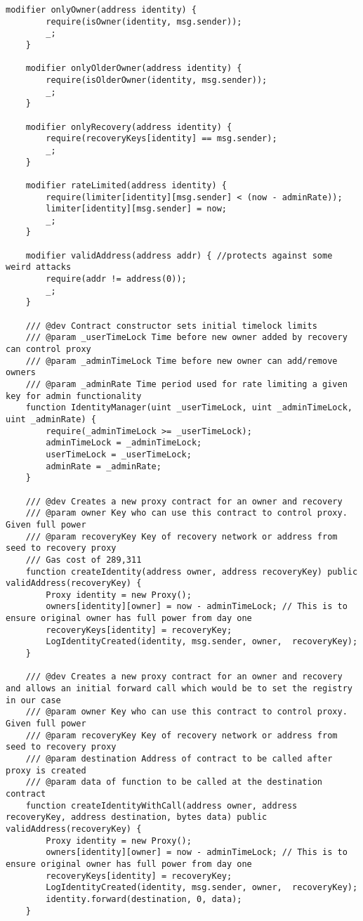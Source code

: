 \begin{itemize}
\begin{lstlisting}[language=Solidity, numbers=none]
    modifier onlyOwner(address identity) {
        require(isOwner(identity, msg.sender));
        _;
    }

    modifier onlyOlderOwner(address identity) {
        require(isOlderOwner(identity, msg.sender));
        _;
    }

    modifier onlyRecovery(address identity) {
        require(recoveryKeys[identity] == msg.sender);
        _;
    }

    modifier rateLimited(address identity) {
        require(limiter[identity][msg.sender] < (now - adminRate));
        limiter[identity][msg.sender] = now;
        _;
    }

    modifier validAddress(address addr) { //protects against some weird attacks
        require(addr != address(0));
        _;
    }

    /// @dev Contract constructor sets initial timelock limits
    /// @param _userTimeLock Time before new owner added by recovery can control proxy
    /// @param _adminTimeLock Time before new owner can add/remove owners
    /// @param _adminRate Time period used for rate limiting a given key for admin functionality
    function IdentityManager(uint _userTimeLock, uint _adminTimeLock, uint _adminRate) {
        require(_adminTimeLock >= _userTimeLock);
        adminTimeLock = _adminTimeLock;
        userTimeLock = _userTimeLock;
        adminRate = _adminRate;
    }

    /// @dev Creates a new proxy contract for an owner and recovery
    /// @param owner Key who can use this contract to control proxy. Given full power
    /// @param recoveryKey Key of recovery network or address from seed to recovery proxy
    /// Gas cost of 289,311
    function createIdentity(address owner, address recoveryKey) public validAddress(recoveryKey) {
        Proxy identity = new Proxy();
        owners[identity][owner] = now - adminTimeLock; // This is to ensure original owner has full power from day one
        recoveryKeys[identity] = recoveryKey;
        LogIdentityCreated(identity, msg.sender, owner,  recoveryKey);
    }

    /// @dev Creates a new proxy contract for an owner and recovery and allows an initial forward call which would be to set the registry in our case
    /// @param owner Key who can use this contract to control proxy. Given full power
    /// @param recoveryKey Key of recovery network or address from seed to recovery proxy
    /// @param destination Address of contract to be called after proxy is created
    /// @param data of function to be called at the destination contract
    function createIdentityWithCall(address owner, address recoveryKey, address destination, bytes data) public validAddress(recoveryKey) {
        Proxy identity = new Proxy();
        owners[identity][owner] = now - adminTimeLock; // This is to ensure original owner has full power from day one
        recoveryKeys[identity] = recoveryKey;
        LogIdentityCreated(identity, msg.sender, owner,  recoveryKey);
        identity.forward(destination, 0, data);
    }


\end{lstlisting}
\end{itemize}
